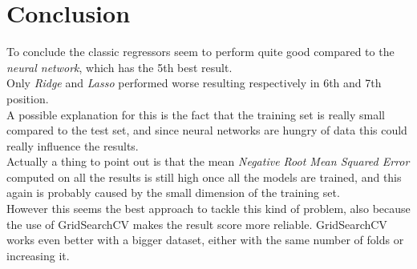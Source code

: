 \documentclass[a4paper,10pt]{report}
\begin{document}
\section{Conclusion}
To conclude the classic regressors seem to perform quite good compared to the \emph{neural network}, which has the 5th best result.\\
Only \emph{Ridge} and \emph{Lasso} performed worse resulting respectively in 6th and 7th position.\\
A possible explanation for this is the fact that the training set is really small compared to the test set, and since neural networks are hungry of data this could really influence the results.\\
Actually a thing to point out is that the mean \emph{Negative Root Mean Squared Error} computed on all the results is still high once all the models are trained, and this again is probably caused by the small dimension of the training set.\\
However this seems the best approach to tackle this kind of problem, also because the use of {\selectfont GridSearchCV} makes the result score more reliable. {\selectfont GridSearchCV} works even better with a bigger dataset, either with the same number of folds or increasing it.
\end{document}
